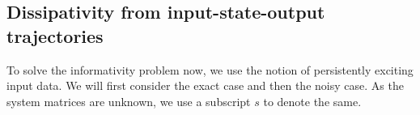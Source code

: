 
\subsection{Dissipativity from input-state-output trajectories}
To solve the informativity problem now, we use the notion of persistently exciting input data. We will first consider the exact case and then the noisy case. As the system matrices are unknown, we use a subscript $s$ to denote the same. 


